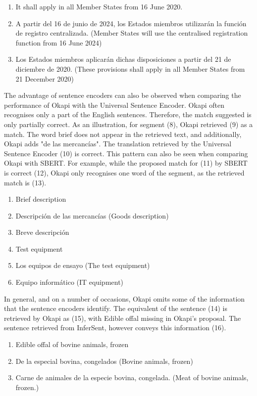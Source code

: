 \begin{enumerate}[resume,label={(\arabic*)}]
	\item It shall apply in all Member States from 16 June 2020.
	\item A partir del 16 de junio de 2024, los Estados miembros utilizarán la función de registro centralizada. (Member States will use the centralised registration function from 16 June 2024)
	\item Los Estados miembros aplicarán dichas disposiciones a partir del 21 de diciembre de 2020. (These provisions shall apply in all Member States from 21 December 2020)
	
\end{enumerate}

The advantage of sentence encoders can also be observed when comparing the performance of Okapi with the Universal Sentence Encoder. Okapi often recognises only a part of the English sentences. Therefore, the match suggested is only partially correct. As an illustration, for segment (8), Okapi retrieved (9) as a match. The word brief does not appear in the retrieved text, and additionally, Okapi adds "de las mercancías". The translation retrieved by the Universal Sentence Encoder (10) is correct. This pattern can also be seen when comparing Okapi with SBERT. For example, while the proposed match for (11) by SBERT is correct (12), Okapi only recognises one word of the segment, as the retrieved match is (13). 

\begin{enumerate}[resume,label={(\arabic*)}]
	\item	Brief description
	\item	Descripción de las mercancías (Goods description)
	\item	Breve descripción
	\item	Test equipment
	\item	Los equipos de ensayo (The test equipment)
	\item	Equipo informático (IT equipment)
\end{enumerate}


In general, and on a number of occasions, Okapi omits some of the information that the sentence encoders identify. The equivalent of the sentence (14) is retrieved by Okapi as (15), with Edible offal missing in Okapi’s proposal. The sentence retrieved from InferSent, however conveys this information (16).

\begin{enumerate}[resume,label={(\arabic*)}]
	\item	Edible offal of bovine animals, frozen
	\item	De la especial bovina, congelados (Bovine animals, frozen)
	\item	Carne de animales de la especie bovina, congelada. (Meat of bovine animals, frozen.)
\end{enumerate}

